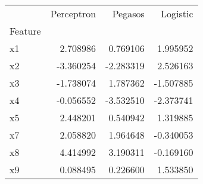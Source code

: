 \begin{tabular}{lrrr}
\toprule
 & Perceptron & Pegasos & Logistic \\
Feature &  &  &  \\
\midrule
x1 & 2.708986 & 0.769106 & 1.995952 \\
x2 & -3.360254 & -2.283319 & 2.526163 \\
x3 & -1.738074 & 1.787362 & -1.507885 \\
x4 & -0.056552 & -3.532510 & -2.373741 \\
x5 & 2.448201 & 0.540942 & 1.319885 \\
x7 & 2.058820 & 1.964648 & -0.340053 \\
x8 & 4.414992 & 3.190311 & -0.169160 \\
x9 & 0.088495 & 0.226600 & 1.533850 \\
\bottomrule
\end{tabular}
